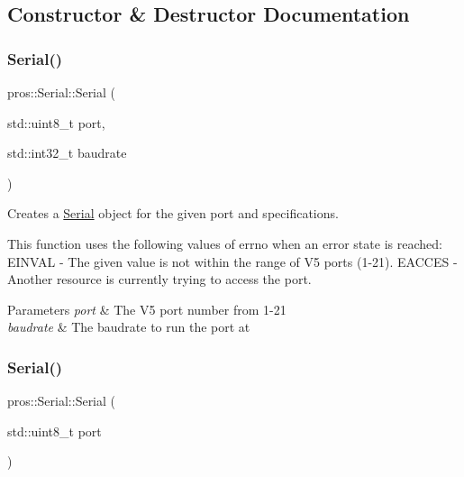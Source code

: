 \subsection{Constructor \& Destructor Documentation}
\mbox{\label{classpros_1_1Serial_a20b7c3c88af816af3078939b048dcf4b}} 
\subsubsection{\texorpdfstring{Serial()}{Serial()}\hspace{0.1cm}{\footnotesize\ttfamily [1/2]}}
{\footnotesize\ttfamily pros\+::\+Serial\+::\+Serial (\begin{DoxyParamCaption}\item[{std\+::uint8\+\_\+t}]{port,  }\item[{std\+::int32\+\_\+t}]{baudrate }\end{DoxyParamCaption})\hspace{0.3cm}{\ttfamily [explicit]}}



Creates a \hyperlink{classpros_1_1Serial}{Serial} object for the given port and specifications. 

This function uses the following values of errno when an error state is reached\+: E\+I\+N\+V\+AL -\/ The given value is not within the range of V5 ports (1-\/21). E\+A\+C\+C\+ES -\/ Another resource is currently trying to access the port.


\begin{DoxyParams}{Parameters}
{\em port} & The V5 port number from 1-\/21 \\
\hline
{\em baudrate} & The baudrate to run the port at \\
\hline
\end{DoxyParams}
\mbox{\label{classpros_1_1Serial_a32311eebb33cab5a52e0a8743d3bd9da}} 
\subsubsection{\texorpdfstring{Serial()}{Serial()}\hspace{0.1cm}{\footnotesize\ttfamily [2/2]}}
{\footnotesize\ttfamily pros\+::\+Serial\+::\+Serial (\begin{DoxyParamCaption}\item[{std\+::uint8\+\_\+t}]{port }\end{DoxyParamCaption})\hspace{0.3cm}{\ttfamily [explicit]}}



